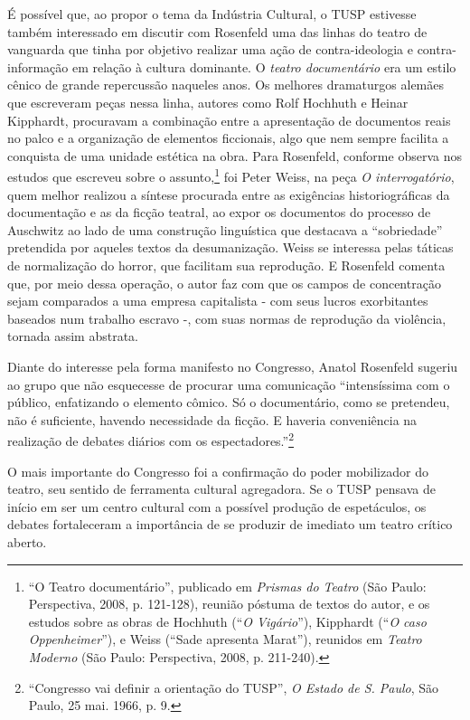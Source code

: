É possível que, ao propor o tema da Indústria Cultural, o TUSP estivesse
também interessado em discutir com Rosenfeld uma das linhas do teatro de
vanguarda que tinha por objetivo realizar uma ação de contra-ideologia e
contra-informação em relação à cultura dominante. O \textit{teatro
documentário} era um estilo cênico de grande repercussão naqueles anos.
Os melhores dramaturgos alemães que escreveram peças nessa linha,
autores como Rolf Hochhuth e Heinar Kipphardt, procuravam a combinação
entre a apresentação de documentos reais no palco e a organização de
elementos ficcionais, algo que nem sempre facilita a conquista de uma
unidade estética na obra. Para Rosenfeld, conforme observa nos estudos
que escreveu sobre o assunto,\footnote{“O Teatro documentário”,
  publicado em \textit{Prismas do Teatro} (São Paulo: Perspectiva, 2008, p.
  121-128), reunião póstuma de textos do autor, e os estudos sobre as
  obras de Hochhuth (“\textit{O Vigário}”), Kipphardt (“\textit{O caso
  Oppenheimer}”), e Weiss (“Sade apresenta Marat”), reunidos em
  \textit{Teatro Moderno} (São Paulo: Perspectiva, 2008, p. 211-240).} foi
Peter Weiss, na peça \textit{O interrogatório}, quem melhor realizou a
síntese procurada entre as exigências historiográficas da documentação e
as da ficção teatral, ao expor os documentos do processo de Auschwitz ao
lado de uma construção linguística que destacava a “sobriedade”
pretendida por aqueles textos da desumanização. Weiss se interessa pelas
táticas de normalização do horror, que facilitam sua reprodução. E
Rosenfeld comenta que, por meio dessa operação, o autor faz com que os
campos de concentração sejam comparados a uma empresa capitalista - com
seus lucros exorbitantes baseados num trabalho escravo -, com suas
normas de reprodução da violência, tornada assim abstrata.

Diante do interesse pela forma manifesto no Congresso, Anatol Rosenfeld
sugeriu ao grupo que não esquecesse de procurar uma comunicação
“intensíssima com o público, enfatizando o elemento cômico. Só o
documentário, como se pretendeu, não é suficiente, havendo necessidade
da ficção. E haveria conveniência na realização de debates diários com
os espectadores.”\footnote{“Congresso vai definir a orientação do TUSP”,
  \textit{O Estado de S. Paulo}, São Paulo, 25 mai. 1966, p. 9.}

O mais importante do Congresso foi a confirmação do poder mobilizador do
teatro, seu sentido de ferramenta cultural agregadora. Se o TUSP pensava
de início em ser um centro cultural com a possível produção de
espetáculos, os debates fortaleceram a importância de se produzir de
imediato um teatro crítico aberto.

